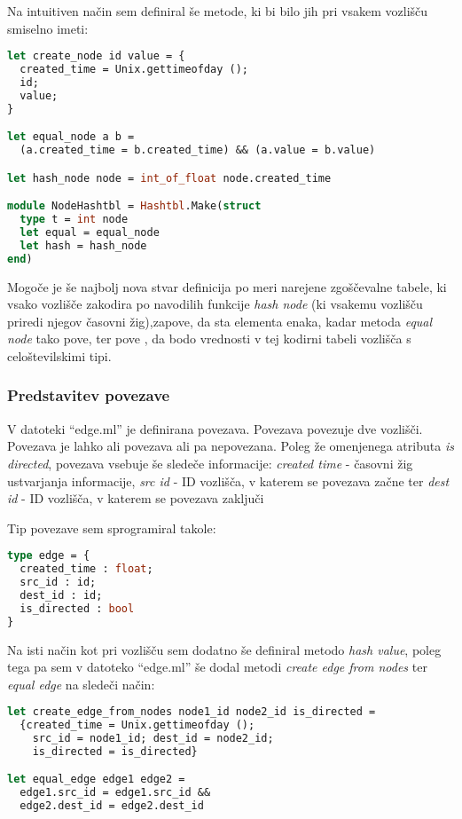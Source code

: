\documentclass[mat1, tisk]{fmfdelo}
\begin{document}
Na intuitiven način sem definiral še metode, ki bi bilo jih pri vsakem vozlišču smiselno imeti:

\begin{lstlisting}[language=Caml, caption={Preostale metode za vozlišča}, label={lst:node_ocaml_other}]
let create_node id value = {
  created_time = Unix.gettimeofday ();
  id;
  value;
}

let equal_node a b =
  (a.created_time = b.created_time) && (a.value = b.value)

let hash_node node = int_of_float node.created_time

module NodeHashtbl = Hashtbl.Make(struct
  type t = int node
  let equal = equal_node
  let hash = hash_node
end)
\end{lstlisting}

Mogoče je še najbolj nova stvar definicija po meri narejene zgoščevalne tabele, ki vsako vozlišče zakodira po navodilih funkcije \textit{hash node} 
(ki vsakemu vozlišču priredi njegov časovni žig),zapove, da sta elementa enaka, kadar metoda \textit{equal node} tako pove, ter pove , da bodo vrednosti v tej kodirni tabeli vozlišča s celoštevilskimi tipi.
  

\subsubsection{Predstavitev povezave}
V datoteki ``edge.ml'' je definirana povezava. Povezava povezuje dve vozlišči. Povezava je lahko ali povezava ali pa nepovezana. Poleg že omenjenega atributa \textit{is directed}, povezava vsebuje še sledeče informacije:
\textit{created time} - časovni žig ustvarjanja informacije, \textit{src id} - ID vozlišča, v katerem se povezava začne ter \textit{dest id} - ID vozlišča, v katerem se povezava zaključi

Tip povezave sem sprogramiral takole: 

\begin{lstlisting}[language=Caml, caption={Definicija povezave v OCamlu}, label={lst:edge_ocaml_type}]
type edge = {
  created_time : float;
  src_id : id;
  dest_id : id;
  is_directed : bool
}
\end{lstlisting}

Na isti način kot pri vozlišču sem dodatno še definiral metodo \textit{hash value}, poleg tega pa sem v datoteko ``edge.ml'' še dodal metodi \textit{create edge from nodes} ter \textit{equal edge} na sledeči način:

\begin{lstlisting}[language=Caml, caption={Preostale metode za povezave}, label={edge_ocaml_other}]
let create_edge_from_nodes node1_id node2_id is_directed = 
  {created_time = Unix.gettimeofday (); 
    src_id = node1_id; dest_id = node2_id; 
    is_directed = is_directed}

let equal_edge edge1 edge2 =
  edge1.src_id = edge1.src_id && 
  edge2.dest_id = edge2.dest_id
\end{lstlisting}
\end{document}

